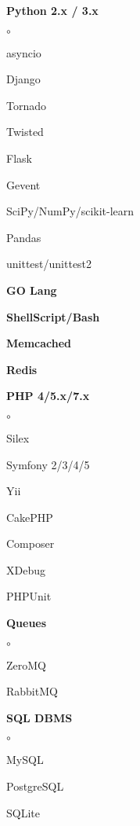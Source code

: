 \documentclass{cv}
\begin{document}
  \begin{multicols}{3}
    \begin {list}{\textbullet}{\itemsep=0mm}
      \item \textbf{Python 2.x / 3.x}
        \begin {list}{$\circ$}{}
          \item asyncio
          \item Django
          \item Tornado
          \item Twisted
          \item Flask
          \item Gevent
          \item SciPy/NumPy/scikit-learn
          \item Pandas
          \item unittest/unittest2
        \end{list}
      \item \textbf{GO Lang}
      \item \textbf{ShellScript/Bash}
      \item \textbf{Memcached}
      \item \textbf{Redis}
      \columnbreak
      \item \textbf{PHP 4/5.x/7.x}
        \begin {list}{$\circ$}{}
          \item Silex
          \item Symfony 2/3/4/5
          \item Yii
          \item CakePHP
          \item Composer
          \item XDebug
          \item PHPUnit
        \end{list}
      \item \textbf{Queues}
        \begin {list}{$\circ$}{}
          \item ZeroMQ
          \item RabbitMQ
        \end{list}
      \columnbreak
      \item \textbf{SQL DBMS}
        \begin {list}{$\circ$}{}
          \item MySQL
          \item PostgreSQL
          \item SQLite

\end{list}
\end{list}
\end{multicols}
\end{document}
